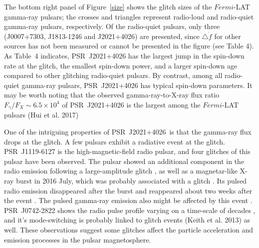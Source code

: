 \documentclass[12pt,preprint]{aastex}
\newcommand{\psr}{PSR~J2021+4026}
\begin{document}
  The bottom right panel of Figure~\ref{size} shows the glitch sizes of the $Fermi$-LAT gamma-ray pulsars; the crosses  and triangles  represent radio-loud and radio-quiet gamma-ray pulsars, respectively.
  Of the radio-quiet pulsars, only three (J0007+7303, J1813-1246 and J2021+4026) are presented,
  since $\triangle \dot{f}$  for other sources has not been measured or cannot be presented in the figure (see Table 4).
  As Table~4 indicates, PSR~J2021+4026 has the  largest jump in the spin-down rate at the glitch,  the smallest
  spin-down power, and a larger spin-down age compared to other  glitching  radio-quiet pulsars. By contrast, among all radio-quiet
  gamma-ray pulsars,  PSR~J2021+4026 has typical spin-down parameters.
  It may be worth noting that the observed gamma-ray-to-X-ray flux ratio $F_{\gamma}/F_X\sim 6.5\times 10^4$
  of PSR~J2021+4026   is the largest among the $Fermi$-LAT pulsars (Hui et al. 2017)

One of the intriguing properties of \psr\ is that the gamma-ray flux drops at the glitch.  A few pulsars exhibit a radiative event at the glitch. 
PSR~J1119-6127 is the high-magnetic-field radio pulsar, and
four glitches of this pulsar have been observed.
The pulsar showed an additional component in the radio emission following a large-amplitude glitch \citep{wel11, ant15}, as well as a magnetar-like X-ray burst in 2016 July, which was probably
associated with a glitch \citep{arc16, gog16}.
Its pulsed radio emission disappeared after the burst and reappeared
about two weeks after the event \citep{bur16, maj17}. The pulsed gamma-ray emission also might be affected by this event \citep{tam16}. 
PSR~J0742-2822 shows the radio pulse profile varying on a time-scale of decades \citep{lyn10, kar11}, and it's mode-switching is probably linked to glitch events (Keith et al. 2013) as well. These observations suggest  some glitches  affect the particle acceleration and emission processes in the pulsar magnetosphere.  
\end{document}
